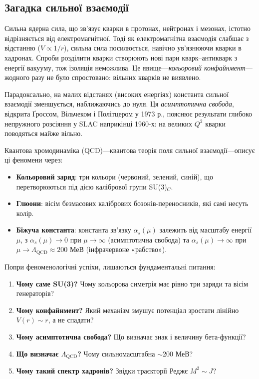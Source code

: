 \documentclass[11pt,a4paper]{article}
\theoremstyle{definition}
\theoremstyle{plain}
\theoremstyle{remark}
\begin{document}
\subsection{Загадка сильної взаємодії}

Сильна ядерна сила, що зв’язує кварки в протонах, нейтронах і мезонах, істотно відрізняється від електромагнітної. Тоді як електромагнітна взаємодія слабшає з відстанню ($V \propto 1/r$), сильна сила посилюється, навічно ув’язнюючи кварки в хадронах. Спроби розділити кварки створюють нові пари кварк–антикварк з енергії вакууму, тож ізоляція неможлива. Це явище—\emph{кольоровий конфайнмент}—жодного разу не було спростовано: вільних кварків не виявлено.

Парадоксально, на малих відстанях (високих енергіях) константа сильної взаємодії зменшується, наближаючись до нуля. Ця \emph{асимптотична свобода}, відкрита Ґроссом, Вільчеком і Політцером у 1973 р., пояснює результати глибоко непружного розсіяння у SLAC наприкінці 1960-х: на великих $Q^2$ кварки поводяться майже вільно.

Квантова хромодинаміка (QCD)—квантова теорія поля сильної взаємодії—описує ці феномени через:
\begin{itemize}[leftmargin=*,itemsep=3pt]
  \item \textbf{Кольоровий заряд}: три кольори (червоний, зелений, синій), що перетворюються під дією калібрової групи SU(3)$_C$.
  \item \textbf{Глюони}: вісім безмасових калібрових бозонів-переносників, які самі несуть колір.
  \item \textbf{Біжуча константа}: константа зв’язку $\alpha_s(\mu)$ залежить від масштабу енергії $\mu$, з $\alpha_s(\mu)\to 0$ при $\mu\to\infty$ (асимптотична свобода) та $\alpha_s(\mu)\to\infty$ при $\mu\to\Lambda_{\mathrm{QCD}}\approx 200$ МеВ (інфрачервоне «рабство»).
\end{itemize}

Попри феноменологічні успіхи, лишаються фундаментальні питання:
\begin{enumerate}[leftmargin=*,itemsep=3pt]
  \item \textbf{Чому саме SU(3)?} Чому кольорова симетрія має рівно три заряди та вісім генераторів?
  \item \textbf{Чому конфайнмент?} Який механізм змушує потенціал зростати лінійно $V(r)\sim r$, а не спадати?
  \item \textbf{Чому асимптотична свобода?} Що визначає знак і величину бета-функції?
  \item \textbf{Що визначає $\Lambda_{\mathrm{QCD}}$?} Чому сильномасштабна $\sim 200$ МеВ?
  \item \textbf{Чому такий спектр хадронів?} Звідки траєкторії Реджє $M^2\sim J$?
\end{enumerate}
\end{document}
